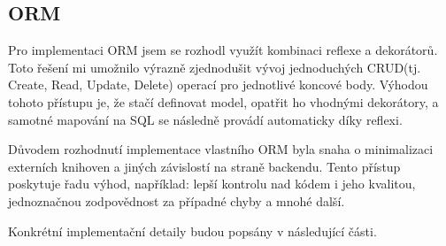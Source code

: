 \subsection{ORM}
Pro implementaci ORM jsem se rozhodl využít kombinaci reflexe a dekorátorů. Toto řešení mi umožnilo výrazně zjednodušit vývoj jednoduchých CRUD(tj. Create, Read, Update, Delete) operací pro jednotlivé koncové body. Výhodou tohoto přístupu je, že stačí definovat model, opatřit ho vhodnými dekorátory, a samotné mapování na SQL se následně provádí automaticky díky reflexi.

Důvodem rozhodnutí implementace vlastního ORM byla snaha o minimalizaci externích knihoven a jiných závislostí na straně backendu. Tento přístup poskytuje řadu výhod, například: lepší kontrolu nad kódem i jeho kvalitou, jednoznačnou zodpovědnost za případné chyby a mnohé další.

Konkrétní implementační detaily budou popsány v následující části.

